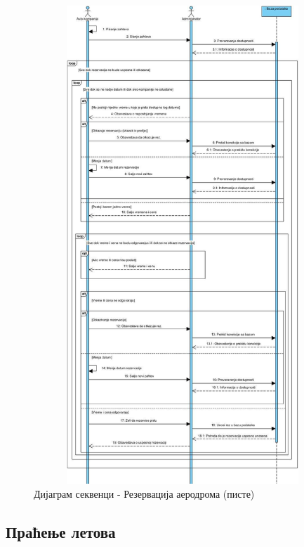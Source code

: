 \documentclass{article}
\begin{document}
\begin{figure}[H]
    \begin{center}
        \includegraphics[width=1.1\textwidth, height=18cm]{Dijagrami_slike/ds_rezervacija_aerodroma.jpg}
        \caption{Дијаграм секвенци - Резервација аеродрома (писте)}
    \end{center}
\end{figure}

\newpage
\subsection{Праћење летова}
\end{document}
